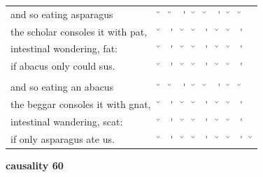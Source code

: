 \documentclass[12pt, landscape]{article}
\begin{document}
\begin{center}
\begin{tabularx}{\textwidth}{
>{\lefting\arraybackslash}X
c
c
c
c
c
c
c
c
c
}

and so eating asparagus & \u{} & \u{} & \'{} & \u{} & \u{} & \'{} & \u{} & \u{} & \\
the scholar consoles it with pat, & \u{} & \'{} & \u{} & \u{} & \'{} & \u{} & \u{} & \'{} & \\
intestinal wondering, fat: & \u{} & \'{} & \u{} & \u{} & \'{} & \u{} & \u{} & \'{} & \\
if abacus only could sus. & \u{} & \'{} & \u{} & \u{} & \'{} & \u{} & \u{} & \'{} & \\
 & & & & & & & & \\
and so eating an abacus & \u{} & \u{} & \'{} & \u{} & \u{} & \'{} & \u{} & \u{} & \\
the beggar consoles it with gnat, & \u{} & \'{} & \u{} & \u{} & \'{} & \u{} & \u{} & \'{} & \\
intestinal wandering, scat: & \u{} & \'{} & \u{} & \u{} & \'{} & \u{} & \u{} & \'{} & \\
if only asparagus ate us. & \u{} & \'{} & \u{} & \u{} & \'{} & \u{} & \u{} & \'{} & \u{} \\

\end{tabularx}
\end{center}

\vspace*{\fill}

\newpage

\vspace*{\fill}

\noindent \textbf{causality 60}
\noindent \hfill \par
\end{document}
